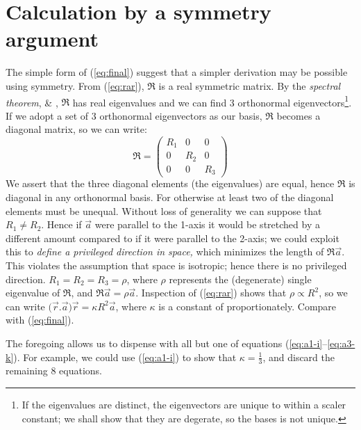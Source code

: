 \documentclass[]{article}
\begin{document}
\section{Calculation by a symmetry argument}\label{sect:symmetry}
The simple form of (\ref{eq:final}) suggest that a simpler derivation may be possible using symmetry. From (\ref{eq:rar}), $\mathfrak{R}$ is a real symmetric matrix. By the \emph{spectral theorem}, \cite{spectral-theorem} \& \cite{bellman1970}, $\mathfrak{R}$ has real eigenvalues and we can find 3 orthonormal eigenvectors\footnote{If the eigenvalues are distinct, the eigenvectors are unique to within a scaler constant; we shall show that they are degerate, so the bases is not unique.}. If we adopt a set of 3 orthonormal eigenvectors as our basis, $\mathfrak{R}$ becomes a diagonal matrix, so we can write:
\[\mathfrak{R}= 
\begin{pmatrix}
R_1 & 0 & 0 \\
0 & R_2 & 0 \\
0 & 0 & R_3
\end{pmatrix}
\]
We assert that the three diagonal elements (the eigenvalues) are equal, hence $\mathfrak{R}$ is diagonal in any orthonormal basis. For otherwise at least two of the diagonal elements must be unequal. Without loss of generality we can suppose that $R_1 \neq R_2$. Hence if $\vec{a}$ were parallel to the 1-axis it would be stretched by a different amount compared to if it were parallel to the 2-axis; we could exploit this to \emph{define a privileged direction in space,} which minimizes the length of $\mathfrak{R}\vec{a}$. This violates the assumption that space is isotropic; hence there is no privileged direction. $R_1=R_2=R_3=\rho$, where $\rho$ represents the (degenerate) single eigenvalue of $\mathfrak{R}$, and $\mathfrak{R}\vec{a}=\rho\vec{a}$. Inspection of (\ref{eq:rar}) shows that $\rho \propto R^2$, so we can write $\big(\vec{r}.\vec{a}\big)\vec{r}=\kappa R^2 \vec{a}$, where $\kappa$ is a constant of proportionately. Compare with (\ref{eq:final}).

The foregoing allows us to dispense with all but one of equations (\ref{eq:a1-i}--\ref{eq:a3-k}). For example, we could use (\ref{eq:a1-i}) to show that $\kappa=\frac{1}{3}$, and discard the remaining 8 equations.
\end{document}
